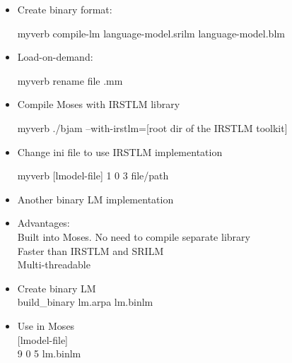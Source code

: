 \documentclass[landscape]{uedslides2C}
\begin{document}

\vspace{20mm}
\begin{itemize}
\item Create binary format: \\
\begin{SaveVerbatim}{myverb} 
compile-lm language-model.srilm language-model.blm
\end{SaveVerbatim}
\colorbox{gray}{}

\item Load-on-demand: \\
\begin{SaveVerbatim}{myverb} 
rename file .mm  
\end{SaveVerbatim}
\colorbox{gray}{}
\end{itemize}


\vspace{20mm}
\begin{itemize}
\item Compile Moses with IRSTLM library \\
\begin{SaveVerbatim}{myverb} 
./bjam --with-irstlm=[root dir of the IRSTLM toolkit] 
\end{SaveVerbatim}
\colorbox{gray}{}

\item Change ini file to use IRSTLM implementation \\
\begin{SaveVerbatim}{myverb} 
[lmodel-file]
1 0 3 file/path
\end{SaveVerbatim}
\colorbox{gray}{}

\end{itemize}



\begin{itemize}
\item Another binary LM implementation
\item Advantages:
  \\ Built into Moses. No need to compile separate library
  \\ Faster than IRSTLM and SRILM
  \\ Multi-threadable
\item {Create binary LM}
  \\  build\_binary lm.arpa lm.binlm
\item {Use in Moses}
  \\ {[}lmodel-file{]}
  \\ 9 0 5 lm.binlm

\end{itemize}
\end{document}
